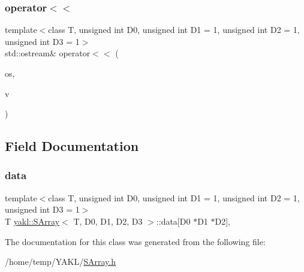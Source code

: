 \subsubsection{\texorpdfstring{operator$<$$<$}{operator<<}}
{\footnotesize\ttfamily template$<$class T, unsigned int D0, unsigned int D1 = 1, unsigned int D2 = 1, unsigned int D3 = 1$>$ \\
std\+::ostream\& operator$<$$<$ (\begin{DoxyParamCaption}\item[{std\+::ostream \&}]{os,  }\item[{\hyperlink{classyakl_1_1SArray}{S\+Array}$<$ T, D0, D1, D2, D3 $>$ const \&}]{v }\end{DoxyParamCaption})\hspace{0.3cm}{\ttfamily [friend]}}



\subsection{Field Documentation}
\mbox{\label{classyakl_1_1SArray_a6cb99563237f388b12a0ab0eb7f05d50}} 
\subsubsection{\texorpdfstring{data}{data}}
{\footnotesize\ttfamily template$<$class T, unsigned int D0, unsigned int D1 = 1, unsigned int D2 = 1, unsigned int D3 = 1$>$ \\
T \hyperlink{classyakl_1_1SArray}{yakl\+::\+S\+Array}$<$ T, D0, D1, D2, D3 $>$\+::data\mbox{[}D0 $\ast$D1 $\ast$D2\mbox{]}\hspace{0.3cm}{\ttfamily [mutable]}, {\ttfamily [protected]}}



The documentation for this class was generated from the following file\+:\begin{DoxyCompactItemize}
\item 
/home/temp/\+Y\+A\+K\+L/\hyperlink{SArray_8h}{S\+Array.\+h}\end{DoxyCompactItemize}
